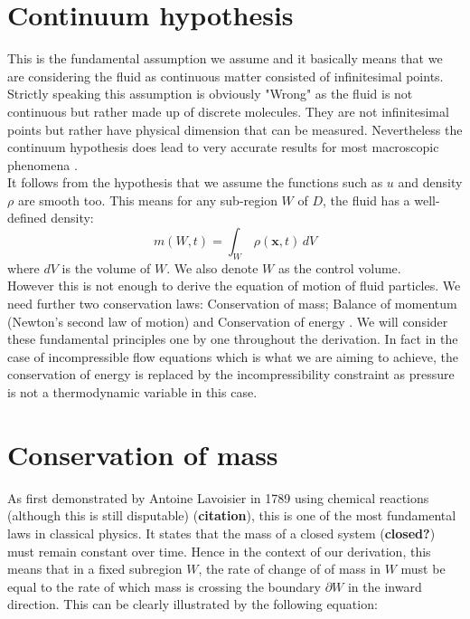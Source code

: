 \section{Continuum hypothesis}
This is the fundamental assumption we assume and it basically means that we are considering the fluid as continuous matter consisted of infinitesimal points. Strictly speaking this assumption is obviously "Wrong" as the fluid is not continuous but rather made up of discrete molecules. They are not infinitesimal points but rather have physical dimension that can be measured. Nevertheless the continuum hypothesis does lead to very accurate results for most macroscopic phenomena \cite{chorin1990mathematical}.\\

It follows from the hypothesis that we assume the functions such as $u$ and density $\rho$ are smooth too. This means for any sub-region $W$ of $D$, the fluid has a well-defined density:
\begin{equation}
m(W,t) = \int_W\,\rho(\textbf{x},t)\,dV
\end{equation}
where $dV$ is the volume of $W$. We also denote $W$ as the control volume.\\

However this is not enough to derive the equation of motion of fluid particles. We need further two conservation laws:
Conservation of mass; Balance of momentum (Newton's second law of motion) and Conservation of energy \cite{chorin1990mathematical}. We will consider these fundamental principles one by one throughout the derivation. In fact in the case of incompressible flow equations which is what we are aiming to achieve, the conservation of energy is replaced by the incompressibility constraint as pressure is not a thermodynamic variable in this case.

\section{Conservation of mass}
As first demonstrated by Antoine Lavoisier in 1789 using chemical reactions (although this is still disputable) (\textbf{citation}), this is one of the most fundamental laws in classical physics. It states that the mass of a closed system (\textbf{closed?}) must remain constant over time. Hence in the context of our derivation, this means that in a fixed subregion $W$, the rate of change of of mass in $W$ must be equal to the rate of which mass is crossing the boundary $\partial W$ in the inward direction. This can be clearly illustrated by the following equation:\\

